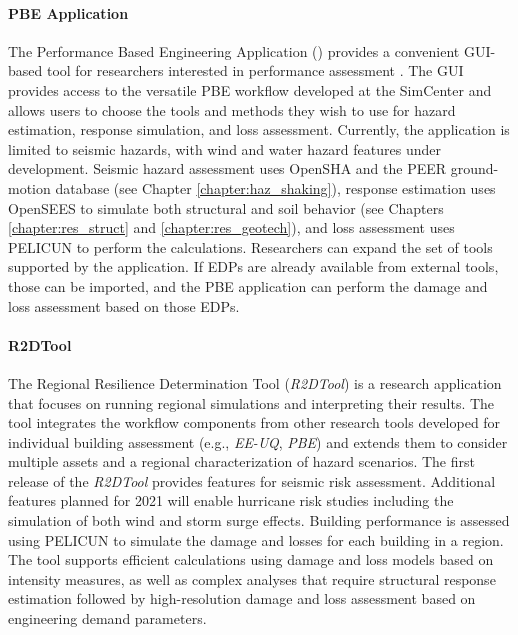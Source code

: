 \paragraph{PBE Application} The Performance Based Engineering Application () provides a convenient GUI-based tool for researchers interested in performance assessment \citep{zsarnoczay2019PBE}. The GUI provides access to the versatile PBE workflow developed at the SimCenter and allows users to choose the tools and methods they wish to use for hazard estimation, response simulation, and loss assessment. Currently, the application is limited to seismic hazards, with wind and water hazard features under development. Seismic hazard assessment uses OpenSHA and the PEER ground-motion database (see Chapter \ref{chapter:haz_shaking}), response estimation uses OpenSEES to simulate both structural and soil behavior (see Chapters \ref{chapter:res_struct} and \ref{chapter:res_geotech}), and loss assessment uses PELICUN to perform the calculations. Researchers can expand the set of tools supported by the application. If EDPs are already available from external tools, those can be imported, and the PBE application can perform the damage and loss assessment based on those EDPs.

\paragraph{R2DTool}
The Regional Resilience Determination Tool (\emph{R2DTool}) is a research application that focuses on running regional simulations and interpreting their results. The tool integrates the workflow components from other research tools developed for individual building assessment (e.g., \emph{EE-UQ}, \emph{PBE}) and extends them to consider multiple assets and a regional characterization of hazard scenarios. The first release of the \emph{R2DTool} provides features for seismic risk assessment. Additional features planned for 2021 will enable hurricane risk studies including the simulation of both wind and storm surge effects. Building performance is assessed using PELICUN to simulate the damage and losses for each building in a region. The tool supports efficient calculations using damage and loss models based on intensity measures, as well as complex analyses that require structural response estimation followed by high-resolution damage and loss assessment based on engineering demand parameters.